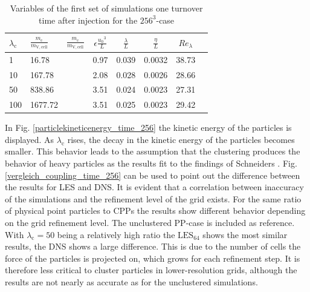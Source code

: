 \documentclass[11pt,a4paper,openany,oneside,parskip=half*]{article}
\begin{document}
\begin{table}[h]
	\begin{center}
	\begin{tabular}{l l | c c c c c c }
	$\lambda_\mathrm{c}$& $\frac{m_\mathrm{c}}{m_\mathrm{V,cell}}$ & $\frac{m_\mathrm{c}}{m_\mathrm{V,cell}}$ &$\epsilon \frac{{u_0}^3}{L}$ & $\frac{\lambda}{L}$ & $\frac{\eta}{L} $ & $Re_\lambda$ \\
	\hline
	\hline
	1 &16.78 & & 0.97& 0.039 & 0.0032 & 38.73 &\\
	10 &167.78 & & 2.08 & 0.028 & 0.0026 & 28.66 &\\
	50 &838.86 & & 3.51 & 0.024 & 0.0023 & 27.31 &\\
	100 &1677.72 & & 3.51 & 0.025 & 0.0023 & 29.42 &\\
	\hline
	\end{tabular}
	\captionsetup{width=0.9\linewidth}
	\caption{Variables of the first set of simulations one turnover time after injection for the $256^3$-case}
	\label{table_values}
	\end{center}
	\end{table}
In Fig. \ref{particlekineticenergy_time_256} the kinetic energy of the particles is displayed. As $\lambda_\mathrm{c}$ rises, the decay in the kinetic energy of the particles becomes smaller. This behavior leads to the assumption that the clustering produces the behavior of heavy particles as the results fit to the findings of Schneiders \cite{Schneiders2017}. Fig. \ref{vergleich_coupling_time_256} can be used to point out the difference between the results for LES and DNS. It is evident that a correlation between inaccuracy of the simulations and the refinement level of the grid exists. For the same ratio of physical point particles to CPPs the results show different behavior depending on the grid refinement level. The unclustered PP-case is included as reference. With $\lambda_\mathrm{c}=50$ being a relatively high ratio the $\mathrm{LES}_\mathrm{64}$ shows the most similar results, the DNS shows a large difference. This is due to the number of cells the force of the particles is projected on, which grows for each refinement step. It is therefore less critical to cluster particles in lower-resolution grids, although the results are not nearly as accurate as for the unclustered simulations. 
\end{document}
